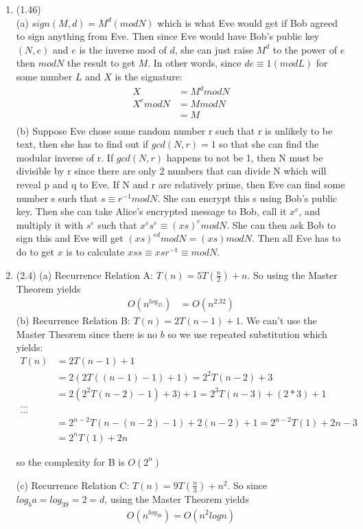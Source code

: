 \documentclass{article}
\begin{document}
\begin{enumerate}
		\item 
			(1.46)
			\\
			(a) $sign(M,d) = M^d(modN)$ which is what Eve would get if Bob agreed to sign anything from Eve. Then since Eve would have Bob's public key $(N,e)$ and $e$ is the inverse mod of $d$, she can just raise $M^d$ to the power of $e$ then $modN$ the result to get $M$. In other words, since $de \equiv1(mod{L})$ for some number $L$ and $X$ is the signature:
			\begin{align*}
				 X &= M^dmodN \\
				X^emodN &= MmodN \\
				&= M \\
			\end{align*}
			(b) Suppose Eve chose some random number r such that r is unlikely to be text, then she has to find out if $gcd(N, r) = 1$ so that she can find the modular inverse of r. If $gcd(N, r)$ happens to not be 1, then N must be divisible by r since there are only 2 numbers that can divide N which will reveal p and q to Eve. If N and r are relatively prime, then Eve can find some number s such that $s \equiv r^{-1} modN$. She can encrypt this s using Bob's public key. Then she can take Alice's encrypted message to Bob, call it $x^e$, and multiply it with $s^e$ such that $x^es^e \equiv (xs)^emodN$. She can then ask Bob to sign this and Eve will get $(xs)^{ed}modN = (xs)modN$. Then all Eve has to do to get $x$ is to calculate $xss \equiv xsr^{-1} \equiv modN$.
			\\
			
		\item
			(2.4) (a) Recurrence Relation A: $T(n) = 5T(\frac{n}{2}) + n$. So using the Master Theorem yields
			\begin{align*}
			O(n^{log_25}) &= O(n^{2.32})
			\end{align*}
			(b) Recurrence Relation B: $T(n) = 2T(n-1) + 1$. We can't use the Master Theorem since there is no $b$ so we use repeated substitution which yields:
			\begin{align*}
				T(n) &= 2T(n-1) + 1 \\
				&= 2(2T((n-1)-1)+1) = 2^2T(n-2) + 3 \\
				&= 2(2^2T(n-2)-1)+3)+1 = 2^3T(n-3) + (2*3) + 1 \\
				... \\
				... \\
				&= 2^{n-2}T(n-(n-2)-1)+2(n-2)+1=2^{n-2}T(1)+2n-3 \\
				&=2^nT(1)+2n
			\end{align*}
			\begin{center} so the complexity for B is $O(2^n)$
			\end {center}
			(c) Recurrence Relation C: $T(n) = 9T(\frac{n}{3}) + n^2$. So since $log_ba = log_39 = 2 = d$, using the Master Theorem yields
			\begin{align*}
			O(n^{log_39}) = O(n^{2}logn)
			\end{align*}


\end{enumerate}
\end{document}
